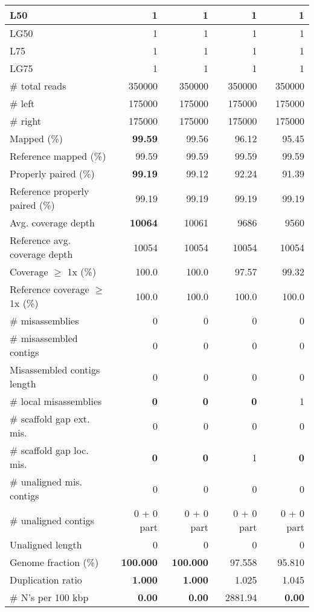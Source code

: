 \documentclass[12pt,a4paper]{article}
\begin{document}
\begin{table}[ht]
\begin{center}
\begin{tabular}{|l*{4}{|r}|}
L50 & 1 & 1 & 1 & 1 \\ \hline
LG50 & 1 & 1 & 1 & 1 \\ \hline
L75 & 1 & 1 & 1 & 1 \\ \hline
LG75 & 1 & 1 & 1 & 1 \\ \hline
\# total reads & 350000 & 350000 & 350000 & 350000 \\ \hline
\# left & 175000 & 175000 & 175000 & 175000 \\ \hline
\# right & 175000 & 175000 & 175000 & 175000 \\ \hline
Mapped (\%) & {\bf 99.59} & 99.56 & 96.12 & 95.45 \\ \hline
Reference mapped (\%) & 99.59 & 99.59 & 99.59 & 99.59 \\ \hline
Properly paired (\%) & {\bf 99.19} & 99.12 & 92.24 & 91.39 \\ \hline
Reference properly paired (\%) & 99.19 & 99.19 & 99.19 & 99.19 \\ \hline
Avg. coverage depth & {\bf 10064} & 10061 & 9686 & 9560 \\ \hline
Reference avg. coverage depth & 10054 & 10054 & 10054 & 10054 \\ \hline
Coverage $\geq$ 1x (\%) & 100.0 & 100.0 & 97.57 & 99.32 \\ \hline
Reference coverage $\geq$ 1x (\%) & 100.0 & 100.0 & 100.0 & 100.0 \\ \hline
\# misassemblies & 0 & 0 & 0 & 0 \\ \hline
\# misassembled contigs & 0 & 0 & 0 & 0 \\ \hline
Misassembled contigs length & 0 & 0 & 0 & 0 \\ \hline
\# local misassemblies & {\bf 0} & {\bf 0} & {\bf 0} & 1 \\ \hline
\# scaffold gap ext. mis. & 0 & 0 & 0 & 0 \\ \hline
\# scaffold gap loc. mis. & {\bf 0} & {\bf 0} & 1 & {\bf 0} \\ \hline
\# unaligned mis. contigs & 0 & 0 & 0 & 0 \\ \hline
\# unaligned contigs & 0 + 0 part & 0 + 0 part & 0 + 0 part & 0 + 0 part \\ \hline
Unaligned length & 0 & 0 & 0 & 0 \\ \hline
Genome fraction (\%) & {\bf 100.000} & {\bf 100.000} & 97.558 & 95.810 \\ \hline
Duplication ratio & {\bf 1.000} & {\bf 1.000} & 1.025 & 1.045 \\ \hline
\# N's per 100 kbp & {\bf 0.00} & {\bf 0.00} & 2881.94 & {\bf 0.00} \\ \hline

\end{tabular}
\end{center}
\end{table}
\end{document}
